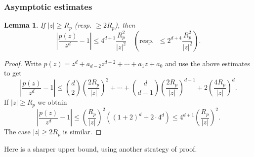 \documentclass[oneside, 12pt]{amsart}
\newcommand{\abs}[1]{\left\vert#1\right\vert}
\theoremstyle{plain}
\newtheorem{lem}[thm]{Lemma}
\theoremstyle{definition}
\numberwithin{equation}{section}       %
\numberwithin{equation}{section}       %
\begin{document}
\subsubsection{Asymptotic estimates}
\begin{vlongue}
\begin{lem}
If $\abs{z}\geq R_p$ (resp. $\geq 2R_p$), then  
\[
\abs{ \frac{p(z)}{z^d} -1 } \leq 4^{d+1} \frac{R_p^2}{\abs{z}^2} \quad \left(\text{resp. }\;  \leq 2^{d+4}  \frac{R_p^2}{\abs{z}^2} \right).
\]
\end{lem}
\begin{proof}
Write $p(z)=z^d+a_{d-2}z^{d-2} +\cdots + a_1z+a_0$ and use the above estimates to get 
\[
\abs{ \frac{p(z)}{z^d} -1 } \leq {d \choose 2} \left(\frac{2R_p}{\abs{z}}\right)^2 +\cdots +  {d \choose d-1} \left(\frac{2R_p}{\abs{z}}\right)^{d-1} + 2\left(\frac{4R_p}{\abs{z}}\right)^{d}. 
\]
If $\abs{z}\geq R_p$ we obtain 
\[
\abs{ \frac{p(z)}{z^d} -1 } \leq \left(\frac{R_p}{\abs{z}}\right)^2 \left( (1+2)^d + 2\cdot 4^d\right) \leq 4^{d+1} \left(\frac{R_p}{\abs{z}}\right)^2.
\]
The case $\abs{z}\geq 2R_p$ is similar.  
\end{proof}
Here is a sharper upper bound, using another strategy of proof. 
\end{vlongue}
\end{document}
